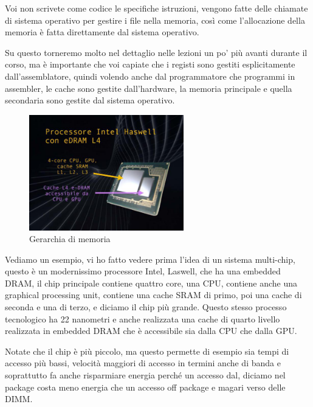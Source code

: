 Voi non scrivete come codice le specifiche istruzioni, vengono fatte delle chiamate di sistema operativo per gestire i file nella memoria, così come l'allocazione della memoria è fatta direttamente dal sistema operativo.

Su questo torneremo molto nel dettaglio nelle lezioni un po' più avanti durante il corso, ma è importante che voi capiate che i registi sono gestiti esplicitamente dall'assemblatore, quindi volendo anche dal programmatore che programmi in assembler, le cache sono gestite dall'hardware, la memoria principale e quella secondaria sono gestite dal sistema operativo.

\FloatBarrier
\begin{figure}[H]
  \centering
  \includegraphics[width=0.60\textwidth,
                    trim=20 20 10 20, %
                    clip]
                    {images/Lez06_p02_fig_02.png}
  \caption{Gerarchia di memoria}
  \label{fig:Lez06_p02_fig_02}
\end{figure}
\FloatBarrier
\noindent

Vediamo un esempio, vi ho fatto vedere prima l'idea di un sistema multi-chip, questo è un modernissimo processore Intel, Laswell, che ha una embedded DRAM, il chip principale contiene quattro core, una CPU, contiene anche una graphical processing unit, contiene una cache SRAM di primo, poi una cache di seconda e una di terzo, e diciamo il chip più grande.
Questo stesso processo tecnologico ha 22 nanometri e anche realizzata una cache di quarto livello realizzata in embedded DRAM che è accessibile sia dalla CPU che dalla GPU.

Notate che il chip è più piccolo, ma questo permette di esempio sia tempi di accesso più bassi, velocità maggiori di accesso in termini anche di banda e soprattutto fa anche risparmiare energia perché un accesso dal, diciamo nel package costa meno energia che un accesso off package e magari verso delle DIMM.

